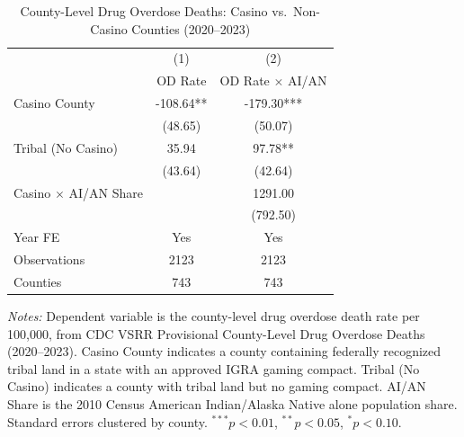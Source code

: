\begin{table}[htbp]
\centering
\caption{County-Level Drug Overdose Deaths: Casino vs.\ Non-Casino Counties (2020--2023)}
\label{tab:county}
\begin{tabular}{lcc}
\hline\hline
 & (1) & (2) \\
 & OD Rate & OD Rate $\times$ AI/AN \\
\hline
Casino County &  -108.64**  &  -179.30***  \\
 &  (48.65)  &  (50.07)  \\
Tribal (No Casino) &  35.94  &  97.78**  \\
 &  (43.64)  &  (42.64)  \\
Casino $\times$ AI/AN Share & &  1291.00  \\
 & &  (792.50)  \\
\hline
Year FE & Yes & Yes \\
Observations &  2123  &  2123  \\
Counties &  743  &  743  \\
\hline\hline
\end{tabular}
\begin{tablenotes}[flushleft]\footnotesize
\item \textit{Notes:} Dependent variable is the county-level drug overdose death rate per 100,000, from CDC VSRR Provisional County-Level Drug Overdose Deaths (2020--2023). Casino County indicates a county containing federally recognized tribal land in a state with an approved IGRA gaming compact. Tribal (No Casino) indicates a county with tribal land but no gaming compact. AI/AN Share is the 2010 Census American Indian/Alaska Native alone population share. Standard errors clustered by county. $^{***}p<0.01$, $^{**}p<0.05$, $^{*}p<0.10$.
\end{tablenotes}
\end{table}

